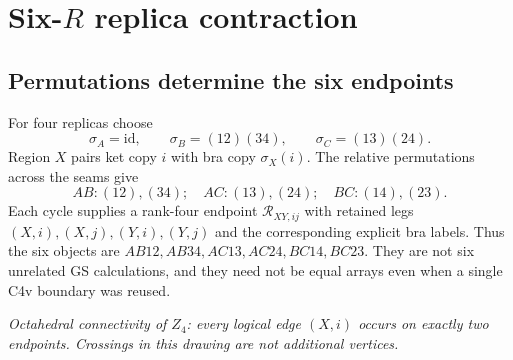 \documentclass[11pt]{article}
\newcommand{\smallnote}[1]{\par\smallskip\noindent\textit{#1}\par\smallskip}
\begin{document}
\section{Six-$R$ replica contraction}
\subsection{Permutations determine the six endpoints}
For four replicas choose
\begin{equation}
 \sigma_A=\mathrm{id},\qquad\sigma_B=(12)(34),\qquad
 \sigma_C=(13)(24).
\end{equation}
Region $X$ pairs ket copy $i$ with bra copy $\sigma_X(i)$.
The relative permutations across the seams give
\begin{equation}
 AB: (12),(34);\quad AC:(13),(24);\quad BC:(14),(23).
\end{equation}
Each cycle supplies a rank-four endpoint $\mathcal R_{XY,ij}$ with retained
legs $(X,i),(X,j),(Y,i),(Y,j)$ and the corresponding explicit bra labels.
Thus the six objects are $AB12,AB34,AC13,AC24,BC14,BC23$.
They are not six unrelated GS calculations, and they need not be equal arrays
even when a single C4v boundary was reused.

\ifdetailed
\begin{center}
\end{center}
\smallnote{Octahedral connectivity of $Z_4$: every logical edge $(X,i)$ occurs
on exactly two endpoints. Crossings in this drawing are not additional vertices.}
\end{document}
